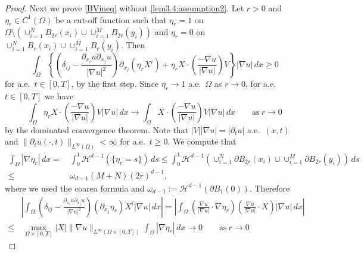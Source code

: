 \documentclass[10pt,a4paper]{amsart}
\begin{document}
\begin{proof}
Next we prove \eqref{BVineq} without \eqref{lem3.4:assumption2}.
Let $r>0$ and $\eta_r \in C^1 (\Omega)$ be a cut-off function such that
$\eta_r =1$ on $\Omega \setminus (\cup_{i=1} ^N B_{2r} (x_i) \cup \cup_{i=1} ^M B_{2r} (y_i))$
and $\eta_r=0$ on $\cup_{i=1} ^N B_{r} (x_i) \cup \cup_{i=1} ^M B_{r} (y_i)$.
Then 
\begin{equation}\label{eta-r1}
\int_{\Omega} \left\{
\left( \delta_{ij} - \frac{ \partial_{x_i} u \partial _{x_j} u }{|\nabla u|^2} \right)
\partial_{x_j} (\eta_r X ^i) 
+\eta_r X \cdot \left( \frac{-\nabla u}{|\nabla u|} \right) V
\right\} |\nabla u| \, dx \geq 0
\end{equation}
for a.e.\ $t \in [0,T]$, by the first step. Since $\eta_r \to 1$ a.e.\ $\Omega$ as $r\to 0$, 
for a.e.\ $t \in [0,T]$ we have
\begin{equation}\label{eta-r2}
\int_{\Omega} \eta_r X \cdot \left( \frac{-\nabla u}{|\nabla u|} \right) V |\nabla u| \, dx
\to
\int_{\Omega} X \cdot \left(\frac{-\nabla u}{|\nabla u|} \right) V |\nabla u| \, dx \qquad \text{as} \ r\to 0
\end{equation}
by the dominated convergence theorem. Note that $| V| |\nabla u| =|\partial _t u | $ a.e.\ $(x,t)$ and $\| \partial _t u (\cdot,t) \|_{L^\infty (\Omega)} <\infty$ for a.e.\ $t \geq 0$. 
We compute that
\begin{equation*}
\begin{split}
\int_{\Omega} |\nabla \eta_r | \, dx
= & \, \int_0 ^1 \mathcal{H}^{d-1} (\{ \eta_r =s \}) \, ds
\leq \int_0 ^1 \mathcal{H}^{d-1} (\cup_{i=1} ^N \partial B_{2r} (x_i) \cup \cup_{i=1} ^M \partial B_{2r} (y_i)) \, ds \\
\leq & \, \omega _{d-1} (M+N) (2r)^{d-1},
\end{split}
\end{equation*}
where we used the coarea formula and $\omega_{d-1} := \mathcal{H}^{d-1} (\partial B_1 (0))$.
Therefore
\begin{equation*}
\begin{split}
&\left| \int_{\Omega} \left( \delta_{ij} - \frac{ \partial_{x_i} u \partial _{x_j} u }{|\nabla u|^2} \right)
(\partial_{x_j} \eta_r) X ^i |\nabla u| \, dx \right|
=
\left| \int_{\Omega} \left( \frac{\nabla u}{|\nabla u|} \cdot \nabla \eta_r \right) 
\left( \frac{\nabla u}{|\nabla u|} \cdot X \right)  |\nabla u| \, dx \right| \\
\leq & \, 
\max _{\Omega\times [0,T]} |X| \| \nabla u \|_{L^\infty (\Omega \times [0,T])}
\int_{\Omega} |\nabla \eta_r | \, dx
\to 0 \qquad \text{as} \ r\to 0
\end{split}

\end{equation*}
\end{proof}
\end{document}
